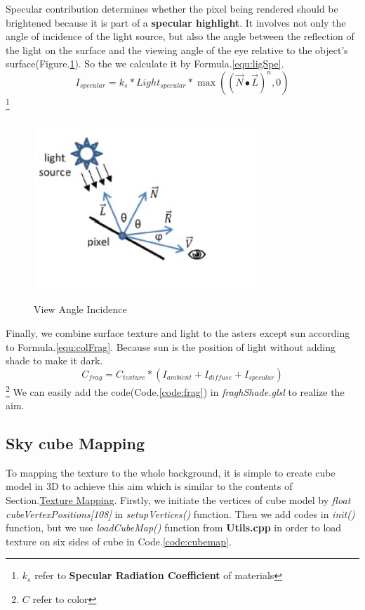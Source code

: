 \documentclass[12pt]{article}
\numberwithin{figure}{subsection}
\numberwithin{table}{subsection}
\numberwithin{equation}{subsection}
\begin{document}
Specular contribution determines whether the pixel being rendered should be
brightened because it is part of a \textbf{specular highlight}. It involves not only the
angle of incidence of the light source, but also the angle between the reflection
of the light on the surface and the viewing angle of the eye relative to the
object’s surface(Figure.\ref{fig:angle of lighting2}). So the we calculate it by Formula.\ref{equ:ligSpe}.
\begin{equation}\label{equ:ligSpe}　
    I_{specular}=k_s*Light_{specular}*\max((\overrightarrow{N}\bullet\overrightarrow{L})^n,0)
\end{equation}\footnote{$k_s$ refer to \textbf{Specular Radiation Coefficient} of materials} 
\begin{figure}[!htbp]
	\centering
	\includegraphics[width=0.75\textwidth]{image/angle of lighting2.png}
	\caption{View Angle Incidence}
    \label{fig:angle of lighting2}
    \cite{alma991002986248905076}
\end{figure}

Finally, we combine surface texture and light to the asters except sun according to Formula.\ref{equ:colFrag}.
Because sun is the position of light without adding shade to make it dark.   
\begin{equation}\label{equ:colFrag}　
    C_{frag}=C_{texture}*(I_{ambient}+I_{diffuse}+I_{specular})
\end{equation}\footnote{$C$ refer to color}
We can easily add the code(Code.\ref{code:frag}) in \emph{fraghShade.glsl} to realize the aim.  
\label{code:frag}


\subsection{Sky cube Mapping}
To mapping the texture to the whole background, it is simple to create cube model in 3D to 
achieve this aim which is similar to the contents of Section.\hyperref[sec:mapping]{Texture Mapping}.
Firstly, we initiate the vertices of cube model 
by \emph{float cubeVertexPositions[108]} in \emph{setupVertices()} function.
Then we add codes in \emph{init()} function, but we use \emph{loadCubeMap()} function from \textbf{Utils.cpp}
in order to load texture on six sides of cube in Code.\ref{code:cubemap}. 
\label{code:cubemap}

\end{document}
